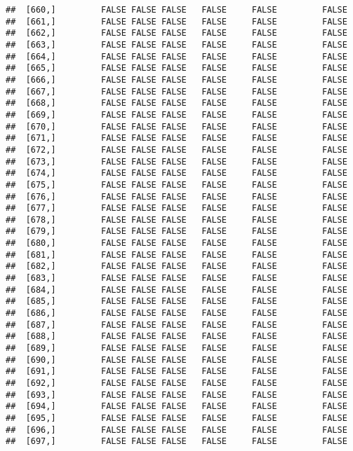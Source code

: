 \documentclass[
]{article}
\begin{document}
\begin{verbatim}
##  [660,]         FALSE FALSE FALSE   FALSE     FALSE         FALSE
##  [661,]         FALSE FALSE FALSE   FALSE     FALSE         FALSE
##  [662,]         FALSE FALSE FALSE   FALSE     FALSE         FALSE
##  [663,]         FALSE FALSE FALSE   FALSE     FALSE         FALSE
##  [664,]         FALSE FALSE FALSE   FALSE     FALSE         FALSE
##  [665,]         FALSE FALSE FALSE   FALSE     FALSE         FALSE
##  [666,]         FALSE FALSE FALSE   FALSE     FALSE         FALSE
##  [667,]         FALSE FALSE FALSE   FALSE     FALSE         FALSE
##  [668,]         FALSE FALSE FALSE   FALSE     FALSE         FALSE
##  [669,]         FALSE FALSE FALSE   FALSE     FALSE         FALSE
##  [670,]         FALSE FALSE FALSE   FALSE     FALSE         FALSE
##  [671,]         FALSE FALSE FALSE   FALSE     FALSE         FALSE
##  [672,]         FALSE FALSE FALSE   FALSE     FALSE         FALSE
##  [673,]         FALSE FALSE FALSE   FALSE     FALSE         FALSE
##  [674,]         FALSE FALSE FALSE   FALSE     FALSE         FALSE
##  [675,]         FALSE FALSE FALSE   FALSE     FALSE         FALSE
##  [676,]         FALSE FALSE FALSE   FALSE     FALSE         FALSE
##  [677,]         FALSE FALSE FALSE   FALSE     FALSE         FALSE
##  [678,]         FALSE FALSE FALSE   FALSE     FALSE         FALSE
##  [679,]         FALSE FALSE FALSE   FALSE     FALSE         FALSE
##  [680,]         FALSE FALSE FALSE   FALSE     FALSE         FALSE
##  [681,]         FALSE FALSE FALSE   FALSE     FALSE         FALSE
##  [682,]         FALSE FALSE FALSE   FALSE     FALSE         FALSE
##  [683,]         FALSE FALSE FALSE   FALSE     FALSE         FALSE
##  [684,]         FALSE FALSE FALSE   FALSE     FALSE         FALSE
##  [685,]         FALSE FALSE FALSE   FALSE     FALSE         FALSE
##  [686,]         FALSE FALSE FALSE   FALSE     FALSE         FALSE
##  [687,]         FALSE FALSE FALSE   FALSE     FALSE         FALSE
##  [688,]         FALSE FALSE FALSE   FALSE     FALSE         FALSE
##  [689,]         FALSE FALSE FALSE   FALSE     FALSE         FALSE
##  [690,]         FALSE FALSE FALSE   FALSE     FALSE         FALSE
##  [691,]         FALSE FALSE FALSE   FALSE     FALSE         FALSE
##  [692,]         FALSE FALSE FALSE   FALSE     FALSE         FALSE
##  [693,]         FALSE FALSE FALSE   FALSE     FALSE         FALSE
##  [694,]         FALSE FALSE FALSE   FALSE     FALSE         FALSE
##  [695,]         FALSE FALSE FALSE   FALSE     FALSE         FALSE
##  [696,]         FALSE FALSE FALSE   FALSE     FALSE         FALSE
##  [697,]         FALSE FALSE FALSE   FALSE     FALSE         FALSE

\end{verbatim}
\end{document}

